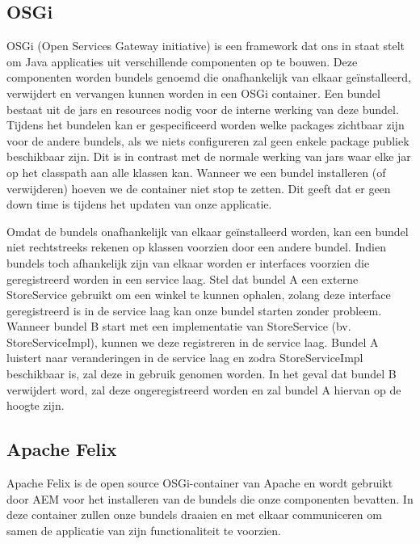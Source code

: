 \documentclass{article}
\begin{document}
	\subsection{OSGi}
	OSGi (Open Services Gateway initiative) is een framework dat ons in staat stelt om Java applicaties uit verschillende componenten op te bouwen. Deze componenten worden bundels genoemd die onafhankelijk van elkaar geïnstalleerd, verwijdert en vervangen kunnen worden in een OSGi container. Een bundel bestaat uit de jars en resources nodig voor de interne werking van deze bundel. Tijdens het bundelen kan er gespecificeerd worden welke packages zichtbaar zijn voor de andere bundels, als we niets configureren zal geen enkele package publiek beschikbaar zijn. Dit is in contrast met de normale werking van jars waar elke jar op het classpath aan alle klassen kan. Wanneer we een bundel installeren (of verwijderen) hoeven we de container niet stop te zetten. Dit geeft dat er geen down time is tijdens het updaten van onze applicatie.
	\par
	Omdat de bundels onafhankelijk van elkaar geïnstalleerd worden, kan een bundel niet rechtstreeks rekenen op klassen voorzien door een andere bundel. Indien bundels toch afhankelijk zijn van elkaar worden er interfaces voorzien die geregistreerd worden in een service laag. Stel dat bundel A een externe StoreService gebruikt om een winkel te kunnen ophalen, zolang deze interface geregistreerd is in de service laag kan onze bundel starten zonder probleem. Wanneer bundel B start met een implementatie van StoreService (bv. StoreServiceImpl), kunnen we deze registreren in de service laag. Bundel A luistert naar veranderingen in de service laag en zodra StoreServiceImpl beschikbaar is, zal deze in gebruik genomen worden. In het geval dat bundel B verwijdert word, zal deze ongeregistreerd worden en zal bundel A hiervan op de hoogte zijn.
	\subsection{Apache Felix}
	Apache Felix is de open source OSGi-container van Apache en wordt gebruikt door AEM voor het installeren van de bundels die onze componenten bevatten. In deze container zullen onze bundels draaien en met elkaar communiceren om samen de applicatie van zijn functionaliteit te voorzien.
\end{document}
